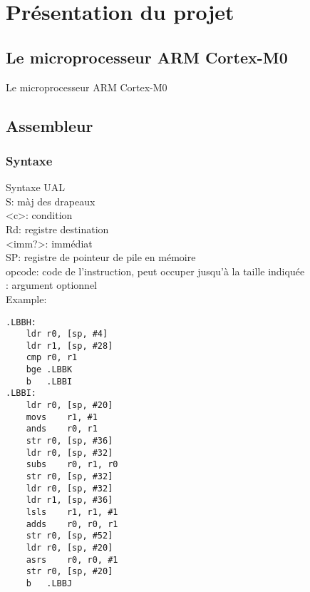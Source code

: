 \section{Présentation du projet}
\subsection{Le microprocesseur ARM Cortex-M0}
	Le microprocesseur ARM Cortex-M0 

\subsection{Assembleur}

\subsubsection{Syntaxe}
Syntaxe UAL\\
S: màj des drapeaux\\
<c>: condition\\
Rd: registre destination\\
<imm?>: immédiat\\
SP: registre de pointeur de pile en mémoire\\
opcode: code de l'instruction, peut occuper jusqu'à la taille indiquée\\
\[\]: argument optionnel\\

Example:
\begin{lstlisting}
.LBBH:                                
	ldr	r0, [sp, #4]
	ldr	r1, [sp, #28]
	cmp	r0, r1
	bge	.LBBK
	b	.LBBI
.LBBI:                                
	ldr	r0, [sp, #20]
	movs	r1, #1
	ands	r0, r1
	str	r0, [sp, #36]
	ldr	r0, [sp, #32]
	subs	r0, r1, r0
	str	r0, [sp, #32]
	ldr	r0, [sp, #32]
	ldr	r1, [sp, #36]
	lsls	r1, r1, #1
	adds	r0, r0, r1
	str	r0, [sp, #52]
	ldr	r0, [sp, #20]
	asrs	r0, r0, #1
	str	r0, [sp, #20]
	b	.LBBJ
\end{lstlisting}
